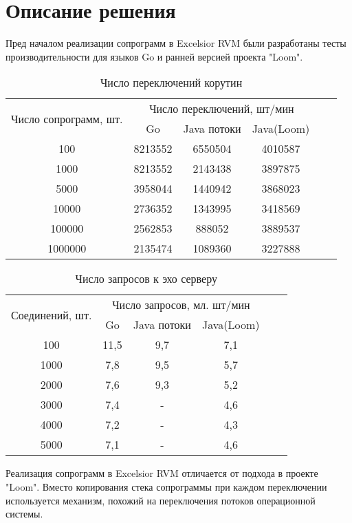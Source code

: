 \section{Описание решения}
	Пред началом реализации сопрограмм в Excelsior RVM были разработаны тесты производительности для языков Go и ранней версией проекта "Loom".
	
	\begin{table}[H]
		\caption{Число переключений корутин}\label{inc-matrix}
		\begin{tabular}{|c|c|c|c|c|c|}
			\hline \multirow{2}{*}{Число сопрограмм, шт.} & \multicolumn{3}{|c|}{Число переключений, шт/мин}    \\
			\cline{2-4}    & Go      & Java потоки & Java(Loom) \\
			\hline 100     & 8213552 & 6550504     & 4010587    \\
			\hline 1000    & 8213552 & 2143438     & 3897875    \\
			\hline 5000    & 3958044 & 1440942     & 3868023    \\
			\hline 10000   & 2736352 & 1343995     & 3418569    \\
			\hline 100000  & 2562853 & 888052      & 3889537    \\
			\hline 1000000 & 2135474 & 1089360     & 3227888    \\
			\hline 
		\end{tabular}
	\end{table}
	
	
	\begin{table}[H]
		\caption{Число запросов к эхо серверу}\label{inc-matrix}
		\begin{tabular}{|c|c|c|c|c|c|}
			\hline \multirow{2}{*}{Соединений, шт.} & 
			\multicolumn{3}{|c|}{Число запросов, мл. шт/мин} \\
			\cline{2-4} & Go   & Java потоки  & Java(Loom)   \\
			\hline 100  & 11,5 & 9,7          & 7,1          \\
			\hline 1000 & 7,8  & 9,5          & 5,7          \\
			\hline 2000 & 7,6  & 9,3          & 5,2          \\
			\hline 3000 & 7,4  & -            & 4,6          \\
			\hline 4000 & 7,2  & -            & 4,3          \\
			\hline 5000 & 7,1  & -            & 4,6          \\
			\hline 
		\end{tabular}
	\end{table}
	 
	Реализация сопрограмм в Excelsior RVM отличается от подхода в проекте "Loom". Вместо
	копирования стека сопрограммы при каждом переключении используется механизм, похожий на
	переключения потоков операционной системы.
	
	
\clearpage